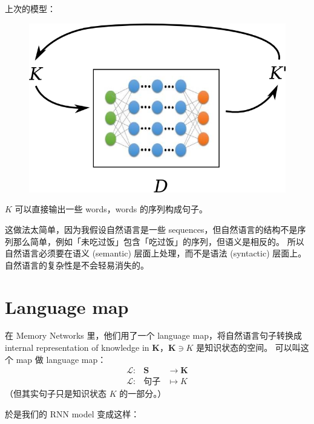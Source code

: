 \documentclass[12pt]{article}
\begin{document}
上次的模型：
\begin{figure}[H]
\centering
\includegraphics[scale=0.75]{reasoner-model.png}
\end{figure}
$K$ 可以直接输出一些 words，words 的序列构成句子。

这做法太简单，因为我假设自然语言是一些 sequences，但自然语言的结构不是序列那么简单，例如「未吃过饭」包含「吃过饭」的序列，但语义是相反的。 所以自然语言必须要在语义 (semantic) 层面上处理，而不是语法 (syntactic) 层面上。 自然语言的复杂性是不会轻易消失的。

\section{Language map}

在 Memory Networks\cite{Weston2015} 里，他们用了一个 language map，将自然语言句子转换成 internal representation of knowledge in $\mathbf{K}$，$\mathbf{K} \ni K$ 是知识状态的空间。 可以叫这个 map 做 language map：
\begin{eqnarray}
\mathcal{L} :& \mathbf{S} & \rightarrow \mathbf{K} \nonumber \\
\mathcal{L} :& \mbox{句子} & \mapsto K \nonumber
\end{eqnarray}
（但其实句子只是知识状态 $K$ 的一部分。）

於是我们的 RNN model 变成这样：
\begin{center}
\end{center}
\end{document}
